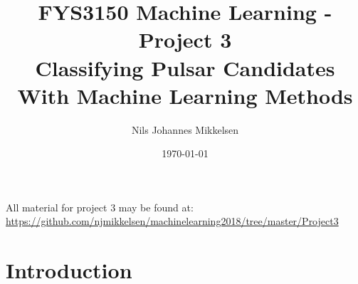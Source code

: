 \documentclass[nofootinbib,reprint,english]{revtex4-1}
\begin{document}
\title{FYS3150 Machine Learning - Project 3\\Classifying Pulsar Candidates With Machine Learning Methods}
\author{Nils Johannes Mikkelsen}
\date{\today}
\noaffiliation
\begin{abstract}

\end{abstract}
\maketitle
All material for project 3 may be found at:\\
{\scriptsize\url{https://github.com/njmikkelsen/machinelearning2018/tree/master/Project3}}
\section{Introduction}
\end{document}
